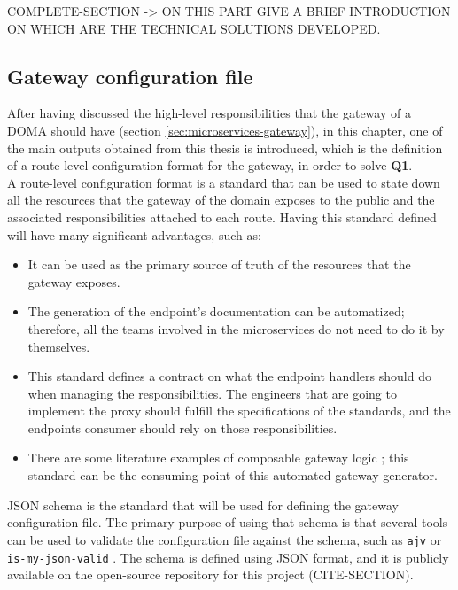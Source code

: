 \documentclass[english, 12pt, a4paper, sci, utf8, a-1b, online]{aaltothesis}
\begin{document}
COMPLETE-SECTION -> ON THIS PART GIVE A BRIEF INTRODUCTION ON WHICH ARE THE TECHNICAL SOLUTIONS DEVELOPED.


\subsection{Gateway configuration file}
\label{sec:gateway-configuration-file}

After having discussed the high-level responsibilities that the gateway of a DOMA should have (section \ref{sec:microservices-gateway}), in this chapter, one of the main outputs obtained from this thesis is introduced, which is the definition of a route-level configuration format for the gateway, in order to solve \textbf{Q1}.\\

A route-level configuration format is a standard that can be used to state down all the resources that the gateway of the domain exposes to the public and the associated responsibilities attached to each route. Having this standard defined will have many significant advantages, such as:

\begin{itemize}
    \item It can be used as the primary source of truth of the resources that the gateway exposes.
    \item The generation of the endpoint's documentation can be automatized; therefore, all the teams involved in the microservices do not need to do it by themselves.
    \item This standard defines a contract on what the endpoint handlers should do when managing the responsibilities. The engineers that are going to implement the proxy should fulfill the specifications of the standards, and the endpoints consumer should rely on those responsibilities.
    \item There are some literature examples of composable gateway logic \cite{UberGateway}; this standard can be the consuming point of this automated gateway generator. 
\end{itemize}

JSON schema is the standard that will be used for defining the gateway configuration file. The primary purpose of using that schema is that several tools can be used to validate the configuration file against the schema, such as \texttt{ajv} \cite{AjvTool} or \texttt{is-my-json-valid} \cite{IsMyJsonValid}. The schema is defined using JSON format, and it is publicly available on the open-source repository for this project (CITE-SECTION).\\
\end{document}
